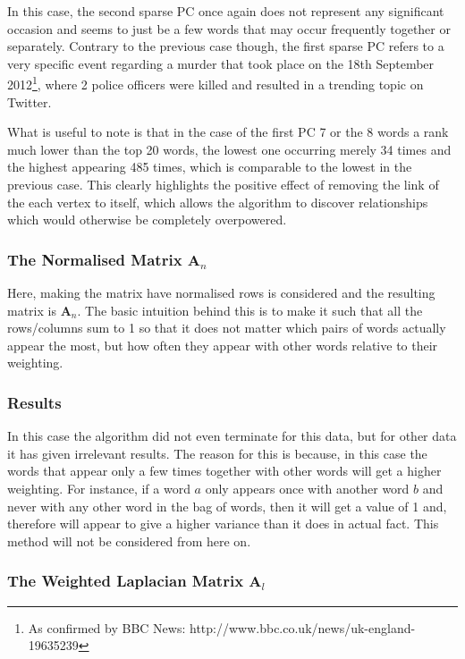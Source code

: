 \documentclass[11pt,a4paper]{article}
\begin{document}
In this case, the second sparse PC once again does not represent any significant occasion and seems to just be a few words that may occur frequently together or separately. Contrary to the previous case though, the first sparse PC refers to a very specific event regarding a murder that took place on the 18th September 2012\footnote{As confirmed by BBC News: http://www.bbc.co.uk/news/uk-england-19635239}, where 2 police officers were killed and resulted in a trending topic on Twitter. 

What is useful to note is that in the case of the first PC 7 or the 8 words a rank much lower than the top 20 words, the lowest one occurring merely 34 times and the highest appearing 485 times, which is comparable to the lowest in the previous case. This clearly highlights the positive effect of removing the link of the each vertex to itself, which allows the algorithm to discover relationships which would otherwise be completely overpowered. 

\subsubsection{The Normalised Matrix $\mathbf{A}_{n}$}
Here, making the matrix have normalised rows is considered and the resulting matrix is $\mathbf{A}_n$. The basic intuition behind this is to make it such that all the rows/columns sum to 1 so that it does not matter which pairs of words actually appear the most, but how often they appear with other words relative to their weighting.

\subsubsection*{Results}
In this case the algorithm did not even terminate for this data, but for other data it has given irrelevant results. The reason for this is because, in this case the words that appear only a few times together with other words will get a higher weighting. For instance, if a word $a$ only appears once with another word $b$ and never with any other word in the bag of words, then it will get a value of 1 and, therefore will appear to give a higher variance than it does in actual fact. This method will not be considered from here on.

\subsubsection{The Weighted Laplacian Matrix $\mathbf{A}_{l}$}
\end{document}
